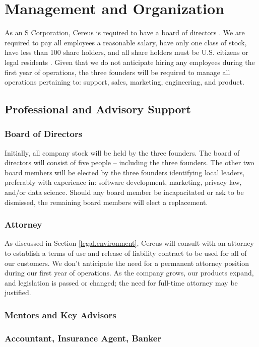 {\let\cleardoublepage\relax \chapter{Management and Organization}}

As an S Corporation, Cereus is required to have a board of directors \cite{UpCounsel.2020}. We are required to pay all employees a reasonable salary, have only one class of stock, have less than 100 share holders, and all share holders must be U.S. citizens or legal residents \cite{wave.2019}. Given that we do not anticipate hiring any employees during the first year of operations, the three founders will be required to manage all operations pertaining to: support, sales, marketing, engineering, and product. 

\section{Professional and Advisory Support}

\subsection{Board of Directors}

Initially, all company stock will be held by the three founders. The board of directors will consist of five people -- including the three founders. The other two board members will be elected by the three founders identifying local leaders, preferably with experience in: software development, marketing, privacy law, and/or data science. Should any board member be incapacitated or ask to be dismissed, the remaining board members will elect a replacement.

\subsection{Attorney}

As discussed in Section \ref{legal.environment}, Cereus will consult with an attorney to establish a terms of use and release of liability contract to be used for all of our customers. We don't anticipate the need for a permanent attorney position during our first year of operations. As the company grows, our products expand, and legislation is passed or changed; the need for full-time attorney may be justified. 

\subsection{Mentors and Key Advisors}

\subsection{Accountant, Insurance Agent, Banker}